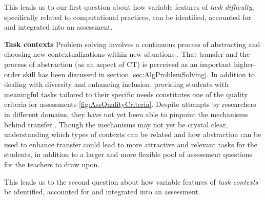 This leads us to our first question about how variable features of \emph{task difficulty}, specifically related to computational practices, can be identified, accounted for and integrated into an assessment.


\noindent \textbf{Task contexts}\newline
Problem solving involves a continuous process of abstracting and choosing new contextualizations within new situations \cite{oers2004recontextualization}. That transfer and the process of abstraction (as an aspect of CT) is perceived as an important higher-order skill has been discussed in section \ref{sec:AlgProblemSolving}. In addition to dealing with diversity and enhancing inclusion, providing students with meaningful tasks tailored to their specific needs constitutes one of the quality criteria for assessments \ref{fig:AssQualityCriteria}. Despite attempts by researchers in different domains, they have not yet been able to pinpoint the mechanisms behind transfer \cite{oers2004recontextualization}. Though the mechanisms may not yet be crystal clear, understanding which types of contexts can be related and how abstraction can be used to enhance transfer could lead to more attractive and relevant tasks for the students, in addition to a larger and more flexible pool of assessment questions for the teachers to draw upon.

This leads us to the second question about how variable features of \emph{task contexts} be identified, accounted for and integrated into an assessment.



